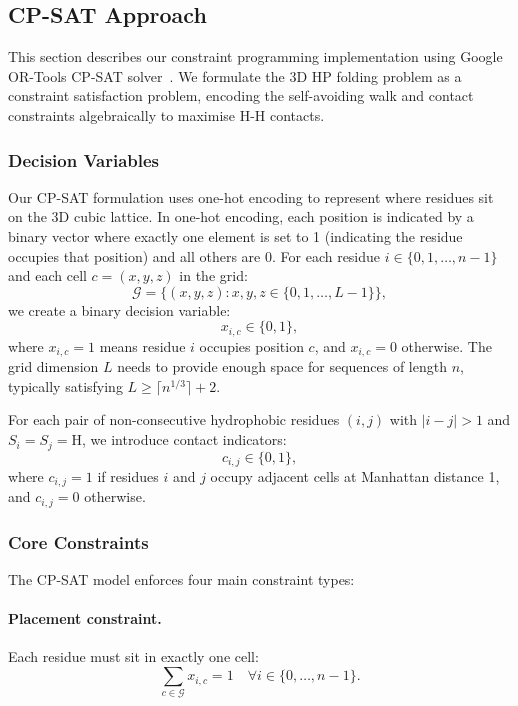 \documentclass{article}
\theoremstyle{plain}
\theoremstyle{definition}
\begin{document}
\subsection{CP-SAT Approach}\label{sec:cpsat_approach}

This section describes our constraint programming implementation using Google OR-Tools CP-SAT solver~\cite{GoogleORTools, Perron2023}. We formulate the 3D HP folding problem as a constraint satisfaction problem, encoding the self-avoiding walk and contact constraints algebraically to maximise H-H contacts.

\subsubsection{Decision Variables}

Our CP-SAT formulation uses one-hot encoding to represent where residues sit on the 3D cubic lattice. In one-hot encoding, each position is indicated by a binary vector where exactly one element is set to 1 (indicating the residue occupies that position) and all others are 0. For each residue $i \in \{0, 1, \ldots, n-1\}$ and each cell $c = (x, y, z)$ in the grid:
\begin{equation}
\mathcal{G} = \{(x,y,z) : x,y,z \in \{0, 1, \ldots, L-1\}\},
\end{equation}
we create a binary decision variable:
\begin{equation}
x_{i,c} \in \{0, 1\},
\end{equation}
where $x_{i,c} = 1$ means residue $i$ occupies position $c$, and $x_{i,c} = 0$ otherwise. The grid dimension $L$ needs to provide enough space for sequences of length $n$, typically satisfying $L \geq \lceil n^{1/3} \rceil + 2$.

For each pair of non-consecutive hydrophobic residues $(i,j)$ with $|i-j| > 1$ and $S_i = S_j = \text{H}$, we introduce contact indicators:
\begin{equation}
c_{i,j} \in \{0, 1\},
\end{equation}
where $c_{i,j} = 1$ if residues $i$ and $j$ occupy adjacent cells at Manhattan distance 1, and $c_{i,j} = 0$ otherwise.

\subsubsection{Core Constraints}

The CP-SAT model enforces four main constraint types:

\paragraph{Placement constraint.} Each residue must sit in exactly one cell:
\begin{equation}
\sum_{c \in \mathcal{G}} x_{i,c} = 1 \quad \forall i \in \{0, \ldots, n-1\}.
\end{equation}
\end{document}
